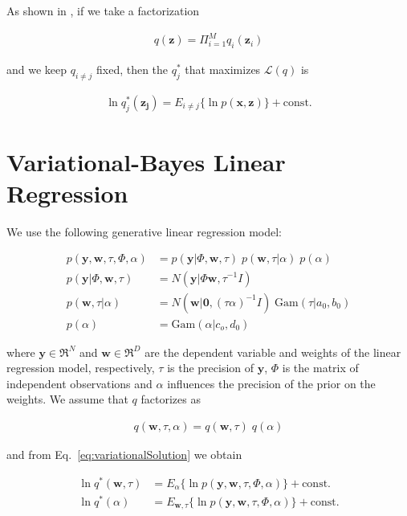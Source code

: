 \documentclass[12pt]{article}
\begin{document}
As shown in \citet[][Eq. 10.9]{bishop06}, if we take a factorization

\begin{align}
q(\mathbf{z})=\Pi_{i=1}^Mq_i(\mathbf{z}_i)
\end{align}

\noindent and we keep ${q_{i\ne j}}$ fixed, then the $q^*_j$ that maximizes
$\mathcal{L}(q)$ is

\begin{align}
\ln q^*_j(\mathbf{z_j})=E_{i\ne j}\{\ln p(\mathbf{x},\mathbf{z})\} + \text{const.}
\label{eq:variationalSolution}
\end{align}

\section{Variational-Bayes Linear Regression}
\label{sec:vblr}

We use the following generative linear regression model:

\begin{align}
p(\mathbf{y},\mathbf{w},\tau,\Phi,\alpha)&=p(\mathbf{y}|\Phi,\mathbf{w},\tau)\;p(\mathbf{w},\tau|\alpha)\;p(\alpha)\label{eq:generativeJoint}\\
p(\mathbf{y}|\Phi,\mathbf{w},\tau)&=N(\mathbf{y}|\Phi\mathbf{w},\tau^{-1}I)\label{eq:generativeLikelihood}\\
p(\mathbf{w},\tau|\alpha)&=N(\mathbf{w}|\mathbf{0},(\tau\alpha)^{-1}I)\;\text{Gam}(\tau|a_0,b_0)\label{eq:generativeWTauGivenAlpha}\\
p(\alpha)&=\text{Gam}(\alpha|c_o,d_0)\label{eq:generativeAlpha}
\end{align}

\noindent where $\mathbf{y}\in\Re^N$ and $\mathbf{w}\in\Re^D$ are the dependent
variable and weights of the linear regression
model, respectively, $\tau$ is the precision of $\mathbf{y}$, $\Phi$ is the
matrix of independent observations and $\alpha$ influences the precision of the
prior on the weights.
%
We assume that $q$ factorizes as

\begin{align}
q(\mathbf{w},\tau,\alpha)=q(\mathbf{w},\tau)\;q(\alpha)\label{eq:qFactorization}
\end{align}

\noindent and from Eq.~\ref{eq:variationalSolution} we obtain

\begin{align}
\ln q^*(\mathbf{w},\tau)&=E_\alpha\{\ln
p(\mathbf{y},\mathbf{w},\tau,\Phi,\alpha)\}+\text{const.}\label{eq:lnQWTau}\\
\ln q^*(\alpha)&=E_{\mathbf{w},\tau}\{\ln p(\mathbf{y},\mathbf{w},\tau,\Phi,\alpha)\}+\text{const.}\label{eq:lnQAlpha}
\end{align}
\end{document}
